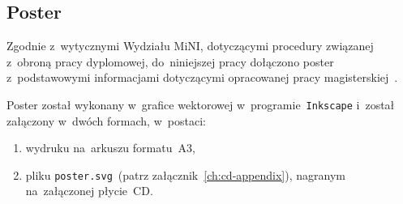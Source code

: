 \documentclass[thesis]{subfiles}
\begin{document}
\begin{appendices}


\chapter{Poster}

Zgodnie z~wytycznymi Wydziału MiNI, dotyczącymi procedury związanej z~obroną pracy dyplomowej, do~niniejszej pracy dołączono poster z~podstawowymi informacjami dotyczącymi opracowanej pracy magisterskiej~\cite{informacje-dot-obron}.

Poster został wykonany w~grafice wektorowej w~programie~\texttt{Inkscape} i~został załączony w~dwóch formach, w~postaci:
\begin{enumerate}
	\item wydruku na~arkuszu formatu~A3,
	\item pliku \mbox{\texttt{poster.svg}}~(patrz załącznik~\ref{ch:cd-appendix}), nagranym na~załączonej płycie~CD.
\end{enumerate}



%


\end{appendices}
\end{document}
